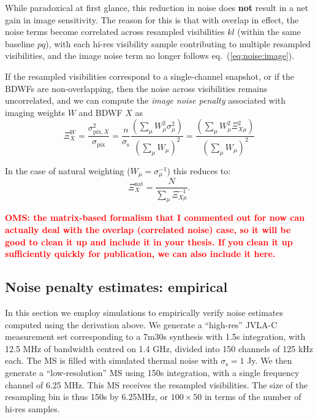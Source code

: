 \documentclass[useAMS,usenatbib]{mn2e}
\newcommand{\OMS}[1]{\textcolor{red}{{\bf OMS: #1}}}
\begin{document}
While paradoxical at first glance, this reduction in noise does {\bf not} result in a net gain in image 
sensitivity. The reason for this is that with overlap in effect, the noise terms become correlated across 
resampled visibilities $kl$ (within the same baseline $pq$), with each hi-res visibility sample contributing to 
multiple resampled visibilities, and the image noise term no longer follows eq.~(\ref{eq:noise:image}).

If the resampled visibilities correspond to a single-channel snapshot, or if the BDWFs are non-overlapping,
then the noise across visibilities remains uncorrelated, and we can compute the \emph{image noise penalty} 
associated with imaging weights $W$ and BDWF $X$ as
\begin{equation}
\Xi^W_X = 
\frac{\sigma_{\mathrm{pix},X}^2}{\sigma_{\mathrm{pix}}} = \frac{n}{\sigma_\mathrm{s}}
\frac{ (\sum_{\mu} W_{\mu}^2 \sigma_\mu^2) }{  (\sum_{\mu} W_{\mu})^2 } =
\frac{ (\sum_{\mu} W_{\mu}^2 \Xi_{X\mu}^2) }{ (\sum_{\mu} W_{\mu})^2 } 
\end{equation}

In the case of natural weighting ($W_\mu=\sigma_\mu^{-1}$) this reduces to:
\begin{equation}
\label{eq:noisepenalty:natural}
\Xi_X^{\mathrm{nat}} = \frac{N}{ \sum_{\mu} \Xi_{X\mu}^{-1} }.
\end{equation}

\OMS{the matrix-based formalism that I commented out for now can actually deal with the overlap (correlated noise) 
case, so it will be good to clean it up and include it in your thesis. If you clean it up sufficiently quickly for
publication, we can also include it here.}

\subsection{Noise penalty estimates: empirical}

\label{subsec:noise}
In this section we employ simulations to empirically verify noise estimates computed using the derivation 
above. We generate a ``high-res''
JVLA-C measurement set corresponding to a 7m30s synthesis with 1.5s integration, with 12.5 MHz of bandwidth
centred on 1.4 GHz, divided into 150 channels of 125 kHz each. The MS is filled with simulated thermal noise 
with $\sigma_\mathrm{s}=1$ Jy. We then generate a ``low-resolution'' MS using 150s integration, with 
a single frequency channel of 6.25 MHz. This MS receives the resampled visibilities. 
The size of the resampling bin is thus 150s by 6.25MHz, or $100\times50$ in terms of the number of hi-res samples.
\end{document}
